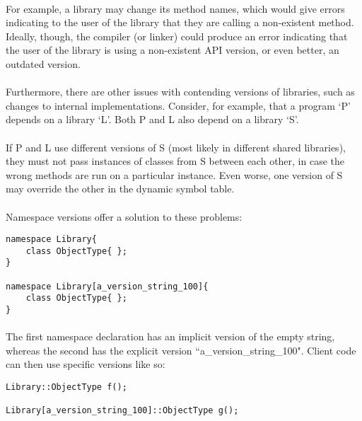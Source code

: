 \documentclass[12pt,twoside,notitlepage]{report}
\begin{document}
\paragraph{}
For example, a library may change its method names, which would give errors indicating to the user of the library that they are calling a non-existent method. Ideally, though, the compiler (or linker) could produce an error indicating that the user of the library is using a non-existent API version, or even better, an outdated version.

\paragraph{}
Furthermore, there are other issues with contending versions of libraries, such as changes to internal implementations. Consider, for example, that a program `P' depends on a library `L'. Both P and L also depend on a library `S'.

\paragraph{}
If P and L use different versions of S (most likely in different shared libraries), they must not pass instances of classes from S between each other, in case the wrong methods are run on a particular instance. Even worse, one version of S may override the other in the dynamic symbol table.

\paragraph{}
Namespace versions offer a solution to these problems:

\begin{lstlisting}
namespace Library{
	class ObjectType{ };
}

namespace Library[a_version_string_100]{
	class ObjectType{ };
}
\end{lstlisting}

\paragraph{}
The first namespace declaration has an implicit version of the empty string, whereas the second has the explicit version ``a\_version\_string\_100". Client code can then use specific versions like so:

\begin{lstlisting}
Library::ObjectType f();

Library[a_version_string_100]::ObjectType g();
\end{lstlisting}
\end{document}
